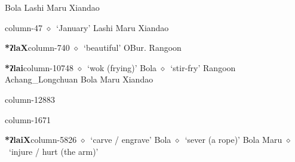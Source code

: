          Bola 
\hspace{1ex}
         Lashi 
\hspace{1ex}
         Maru 
\hspace{1ex}
         Xiandao 
  \item {\footnotesize \textbf{}}{\tiny column-47}
         $\diamond$~`January'
         Lashi 
\hspace{1ex}
         Maru 
\hspace{1ex}
         Xiandao 
  \item {\footnotesize \textbf{*ʔlaX}}{\tiny column-740}
         $\diamond$~`beautiful'
         OBur. 
\hspace{1ex}
         Rangoon 
  \item {\footnotesize \textbf{*ʔlai}}{\tiny column-10748}
         $\diamond$~`wok (frying)'
         Bola 
\hspace{1ex}
         $\diamond$~`stir-fry'
         Rangoon 
\hspace{1ex}
         Achang\_Longchuan 
\hspace{1ex}
         Bola 
\hspace{1ex}
         Maru 
\hspace{1ex}
         Xiandao 
  \item {\footnotesize \textbf{}}{\tiny column-12883}
  \item {\footnotesize \textbf{}}{\tiny column-1671}
  \item {\footnotesize \textbf{*ʔlaiX}}{\tiny column-5826}
         $\diamond$~`carve / engrave'
         Bola 
\hspace{1ex}
         $\diamond$~`sever (a rope)'
         Bola 
\hspace{1ex}
         Maru 
\hspace{1ex}
         $\diamond$~`injure / hurt (the arm)'

